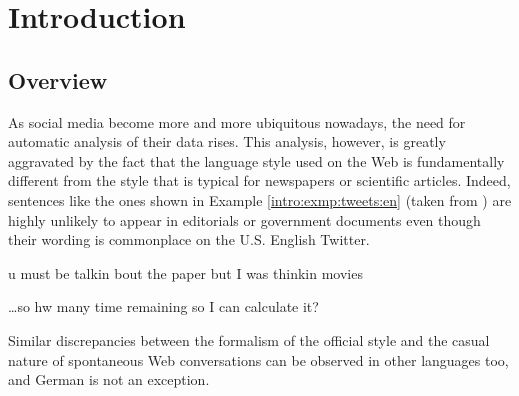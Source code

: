 

\chapter{Introduction}

\section{Overview}
As social media become more and more ubiquitous nowadays, the need for
automatic analysis of their data rises.  This analysis, however, is greatly
aggravated by the fact that the language style used on the Web is
fundamentally different from the style that is typical for newspapers or
scientific articles.  Indeed, sentences like the ones shown in Example
\ref{intro:exmp:tweets:en} (taken from \citet{HanBaldwin:11}) are highly
unlikely to appear in editorials or government documents even though their
wording is commonplace on the U.S. English Twitter.
\begin{example}\label{intro:exmp:tweets:en}
u must be talkin bout the paper but I was thinkin movies

\dots so hw many time remaining so I can calculate it?
\end{example}
Similar discrepancies between the formalism of the official style and the
casual nature of spontaneous Web conversations can be observed in other
languages too, and German is not an exception.

